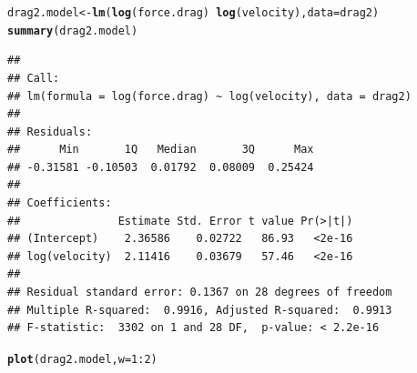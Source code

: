 \documentclass[twoside]{book}\usepackage[]{graphicx}\usepackage[]{xcolor}
\makeatletter
\newcommand{\hlnum}[1]{\textcolor[rgb]{0.686,0.059,0.569}{#1}}%
\newcommand{\hlopt}[1]{\textcolor[rgb]{0,0,0}{#1}}%
\newcommand{\hlstd}[1]{\textcolor[rgb]{0.345,0.345,0.345}{#1}}%
\newcommand{\hlkwb}[1]{\textcolor[rgb]{0.69,0.353,0.396}{#1}}%
\newcommand{\hlkwc}[1]{\textcolor[rgb]{0.333,0.667,0.333}{#1}}%
\newcommand{\hlkwd}[1]{\textcolor[rgb]{0.737,0.353,0.396}{\textbf{#1}}}%
\newenvironment{kframe}{%
 \def\at@end@of@kframe{}%
 \ifinner\ifhmode%
  \def\at@end@of@kframe{\end{minipage}}%
  \begin{minipage}{\columnwidth}%
 \fi\fi%
 \def\FrameCommand##1{\hskip\@totalleftmargin \hskip-\fboxsep
 \colorbox{shadecolor}{##1}\hskip-\fboxsep
     \hskip-\linewidth \hskip-\@totalleftmargin \hskip\columnwidth}%
 \MakeFramed {\advance\hsize-\width
   \@totalleftmargin\z@ \linewidth\hsize
   \@setminipage}}%
 {\par\unskip\endMakeFramed%
 \at@end@of@kframe}
\newenvironment{knitrout}{}{} %
\makeatother
\begin{document}
\begin{solution}
\begin{knitrout}
\end{knitrout}
\begin{knitrout}
\color{fgcolor}\begin{kframe}
\begin{alltt}
\hlstd{drag2.model} \hlkwb{<-} \hlkwd{lm}\hlstd{(}\hlkwd{log}\hlstd{(force.drag)} \hlopt{~} \hlkwd{log}\hlstd{(velocity),} \hlkwc{data} \hlstd{= drag2)}
\hlkwd{summary}\hlstd{(drag2.model)}
\end{alltt}
\begin{verbatim}
## 
## Call:
## lm(formula = log(force.drag) ~ log(velocity), data = drag2)
## 
## Residuals:
##      Min       1Q   Median       3Q      Max 
## -0.31581 -0.10503  0.01792  0.08009  0.25424 
## 
## Coefficients:
##               Estimate Std. Error t value Pr(>|t|)
## (Intercept)    2.36586    0.02722   86.93   <2e-16
## log(velocity)  2.11416    0.03679   57.46   <2e-16
## 
## Residual standard error: 0.1367 on 28 degrees of freedom
## Multiple R-squared:  0.9916,	Adjusted R-squared:  0.9913 
## F-statistic:  3302 on 1 and 28 DF,  p-value: < 2.2e-16
\end{verbatim}
\begin{alltt}
\hlkwd{plot}\hlstd{(drag2.model,} \hlkwc{w} \hlstd{=} \hlnum{1}\hlopt{:}\hlnum{2}\hlstd{)}
\end{alltt}
\end{kframe}


\end{knitrout}
\end{solution}
\end{document}
